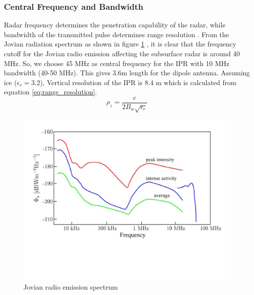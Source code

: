 \subsubsection{Central Frequency and Bandwidth}
Radar frequency determines the penetration capability of the radar, while bandwidth of the transmitted pulse determines range resolution \cite{penetrartion}. From the Jovian radiation spectrum as shown in figure \ref{fig:Jovian_radio_emission} , it is clear that the frequency cutoff for the Jovian radio emission affecting the subsurface radar is around 40 MHz. So, we choose 45 MHz as central frequency for the \ac{IPR} with 10 MHz bandwidth (40-50 MHz). This gives 3.6m length for the dipole antenna. Assuming ice ($\epsilon_{r} = 3.2$), Vertical resolution of the \ac{IPR} is 8.4 m which is calculated from equation \ref{eq:range_resolution}.
%
\begin{equation}
\rho_{z} = \dfrac{c}{2B_{w}\sqrt{\epsilon_{r}}}
\label{eq:range_resolution}
\end{equation}
%
\begin{figure}[bht]
\centering
\includegraphics[scale=0.5]{Figures/Jovian_radio_emission.pdf}
\caption{Jovian radio emission spectrum \cite{Gany_SRS}} 
\label{fig:Jovian_radio_emission}
\end{figure}
%
